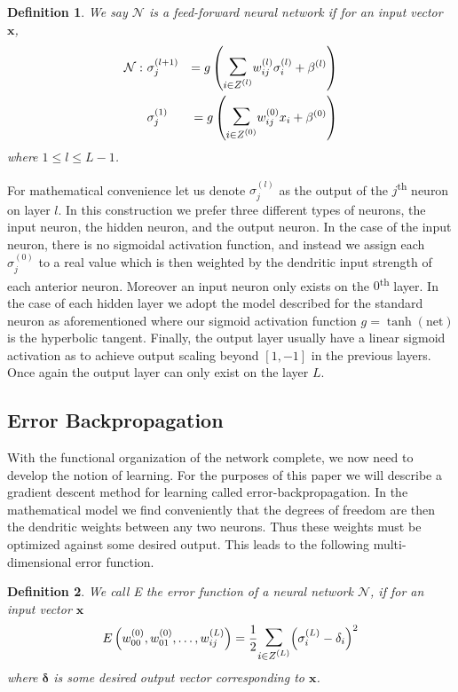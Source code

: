 \documentclass{ib-assignment}
\newtheorem{definition}{Definition}[section]
\newcommand{\Sum}{\mathlarger{\mathlarger{\sum}}}
\begin{document}
    \begin{definition}
    
    We say $\mathcal{N}$ is a feed-forward neural network if for an input vector $\pmb{x}$,
	\[
    	\begin{aligned}
        \mathcal{N}:\ & \sigma_j^{(l+1)} &= g\left(\Sum_{i \in Z^{(l)}}w_{ij}^{(l)}\sigma_i^{(l)} + \beta^{(l)}\right) \\ & \sigma_j^{(1)} &= g\left(\Sum_{i \in Z^{(0)}}w_{ij}^{(0)}x_i + \beta^{(0)} \right)
        \end{aligned}
    \]
    where $1\leq l \leq L-1$. 
    \end{definition}
    
    For mathematical convenience let us denote \( \sigma_j^{(l)}\) as the output of the \(j\)\textsuperscript{th} neuron on layer \(l\). In this construction we prefer three different types of neurons, the input neuron, the hidden neuron, and the output neuron. In the case of the input neuron, there is no sigmoidal activation function, and instead we assign each \( \sigma_j^{(0)}\) to a real value which is then weighted by the dendritic input strength of each anterior neuron. Moreover an input neuron only exists on the \(0\)\textsuperscript{th} layer. In the case of each hidden layer we adopt the model described for the standard neuron as aforementioned where our sigmoid activation function \(g = \tanh(\mathrm{net})\)  is the hyperbolic tangent.%
Finally, the output layer usually have a linear sigmoid activation as to achieve output scaling beyond \([1,-1]\) in the previous layers. Once again the output layer can only exist on the layer \(L\).  

\subsection{Error Backpropagation}
   With the  functional organization of the network complete, we now need to develop the notion of learning. For the purposes of this paper we will describe a gradient descent method for learning called error-backpropagation. In the mathematical model we find conveniently that the degrees of freedom are then the dendritic weights between any two neurons. Thus these weights must be optimized against some desired output. This leads to the following multi-dimensional error function.
   \begin{definition} We call E the error function of a neural network $\mathcal{N}$, if for an input vector \(\pmb{x}\)
\[ E\left(w_{00}^{(0)}, w_{01}^{(0)}, \dots ,w_{ij}^{(L)}\right) = \frac12\Sum_{i \in Z^{(L)}}{\left(\sigma_i^{(L)}-\delta_i\right)^2}\]where \(\pmb{\delta}\) is some desired output vector corresponding to \(\pmb{x}\). 
\end{definition}
\end{document}
